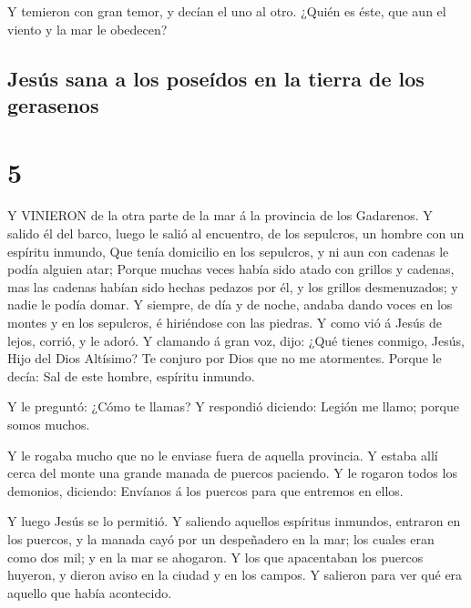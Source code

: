  Y temieron con gran temor, y decían el uno al otro. ¿Quién
es éste, que aun el viento y la mar le obedecen?

\hypertarget{jesuxfas-sana-a-los-poseuxeddos-en-la-tierra-de-los-gerasenos}{%
\subsection{Jesús sana a los poseídos en la tierra de los
gerasenos}\label{jesuxfas-sana-a-los-poseuxeddos-en-la-tierra-de-los-gerasenos}}

\hypertarget{section-4}{%
\section{5}\label{section-4}}

 Y VINIERON de la otra parte de la mar á la provincia de los
Gadarenos.  Y salido él del barco, luego le salió al
encuentro, de los sepulcros, un hombre con un espíritu inmundo,
 Que tenía domicilio en los sepulcros, y ni aun con cadenas
le podía alguien atar;  Porque muchas veces había sido atado
con grillos y cadenas, mas las cadenas habían sido hechas pedazos por
él, y los grillos desmenuzados; y nadie le podía domar.  Y
siempre, de día y de noche, andaba dando voces en los montes y en los
sepulcros, é hiriéndose con las piedras.  Y como vió á Jesús
de lejos, corrió, y le adoró.  Y clamando á gran voz, dijo:
¿Qué tienes conmigo, Jesús, Hijo del Dios Altísimo? Te conjuro por Dios
que no me atormentes.  Porque le decía: Sal de este hombre,
espíritu inmundo.

 Y le preguntó: ¿Cómo te llamas? Y respondió diciendo:
Legión me llamo; porque somos muchos.

 Y le rogaba mucho que no le enviase fuera de aquella
provincia.  Y estaba allí cerca del monte una grande manada
de puercos paciendo.  Y le rogaron todos los demonios,
diciendo: Envíanos á los puercos para que entremos en ellos.

 Y luego Jesús se lo permitió. Y saliendo aquellos
espíritus inmundos, entraron en los puercos, y la manada cayó por un
despeñadero en la mar; los cuales eran como dos mil; y en la mar se
ahogaron.  Y los que apacentaban los puercos huyeron, y
dieron aviso en la ciudad y en los campos. Y salieron para ver qué era
aquello que había acontecido.

